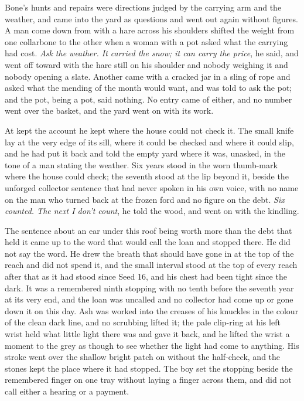 Bone's hunts and repairs were directions judged by the carrying arm and the weather, and came into the yard as questions and went out again without figures. A man come down from  with a hare across his shoulders shifted the weight from one collarbone to the other when a woman with a pot asked what the carrying had cost. \emph{Ask the weather. It carried the snow; it can carry the price}, he said, and went off toward  with the hare still on his shoulder and nobody weighing it and nobody opening a slate. Another came with a cracked jar in a sling of rope and asked what the mending of the month would want, and was told to ask the pot; and the pot, being a pot, said nothing. No entry came of either, and no number went over the basket, and the yard went on with its work.

\scenebreak

At   kept the account he kept where the house could not check it. The small knife lay at the very edge of its sill, where it could be checked and where it could slip, and he had put it back and told the empty yard where it was, unasked, in the tone of a man stating the weather. Six years stood in the worn thumb-mark where the house could check; the seventh stood at the lip beyond it, beside the unforged collector sentence that  had never spoken in his own voice, with no name on the man who turned back at the frozen ford and no figure on the debt. \emph{Six counted. The next I don't count}, he told the wood, and went on with the kindling.

The sentence about an ear under this roof being worth more than the debt that held it came up to the word that would call the loan and stopped there. He did not say the word. He drew the breath that should have gone in at the top of the reach and did not spend it, and the small interval stood at the top of every reach after that as it had stood since Seed 16, and his chest had been tight since the dark. It was a remembered ninth stopping with no tenth before the seventh year at its very end, and the loan was uncalled and no collector had come up  or gone down it on this day. Ash was worked into the creases of his knuckles in the colour of the clean dark line, and no scrubbing lifted it; the pale clip-ring at his left wrist held what little light there was and gave it back, and he lifted the wrist a moment to the grey as though to see whether the light had come to anything. His stroke went over the shallow bright patch on  without the half-check, and the stones kept the place where it had stopped. The boy set the stopping beside the remembered finger on one tray without laying a finger across them, and did not call either a hearing or a payment.

